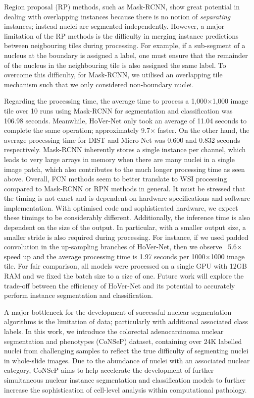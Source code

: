 \documentclass[journal]{IEEEtran}
\begin{document}
	Region proposal (RP) methods, such as Mask-RCNN, show great potential in dealing with overlapping instances because there is no notion of \textit{separating} instances; instead nuclei are segmented independently. However, a major limitation of the RP methods is the difficulty in merging instance predictions between neigbouring tiles during processing. For example, if a sub-segment of a nucleus at the boundary is assigned a label, one must ensure that the remainder of the nucleus in the neighbouring tile is also assigned the same label. To overcome this difficulty, for Mask-RCNN, we utilised an overlapping tile mechanism such that we only considered non-boundary nuclei. 
	
	Regarding the processing time, the average time to process a 1,000$\times$1,000 image tile over 10 runs using Mask-RCNN for segmentation and classification was 106.98 seconds. Meanwhile, HoVer-Net only took an average of 11.04 seconds to complete the same operation; approximately 9.7$\times$ faster. On the other hand, the average processing time for DIST and Micro-Net was 0.600 and 0.832 seconds respectively. Mask-RCNN inherently stores a single instance per channel, which leads to very large arrays in memory when there are many nuclei in a single image patch, which also contributes to the much longer processing time as seen above. Overall, FCN methods seem to better translate to WSI processing compared to Mask-RCNN or RPN methods in general. It must be stressed that the timing is not exact and is dependent on hardware specifications and software implementation. With optimised code and sophisticated hardware, we expect these timings to be considerably different. Additionally, the inference time is also dependent on the size of the output. In particular, with a smaller output size, a smaller stride is also required during processing. For instance, if we used padded convolution in the up-sampling branches of HoVer-Net, then we observe ~5.6$\times$ speed up and the average processing time is 1.97 seconds per 1000$\times$1000 image tile. For fair comparison, all models were processed on a single GPU with 12GB RAM and we fixed the batch size to a size of one. Future work will explore the trade-off between the efficiency of HoVer-Net and its potential to accurately perform instance segmentation and classification. 
	
	A major bottleneck for the development of successful nuclear segmentation algorithms is the limitation of data; particularly with additional associated class labels. In this work, we introduce the colorectal adenocarcinoma nuclear segmentation and phenotypes (CoNSeP) dataset, containing over 24K labelled nuclei from challenging samples to reflect the true difficulty of segmenting nuclei in whole-slide images. Due to the abundance of nuclei with an associated nuclear category, CoNSeP aims to help accelerate the development of further simultaneous nuclear instance segmentation and classification models to further increase the sophistication of cell-level analysis within computational pathology. 
	
\end{document}
